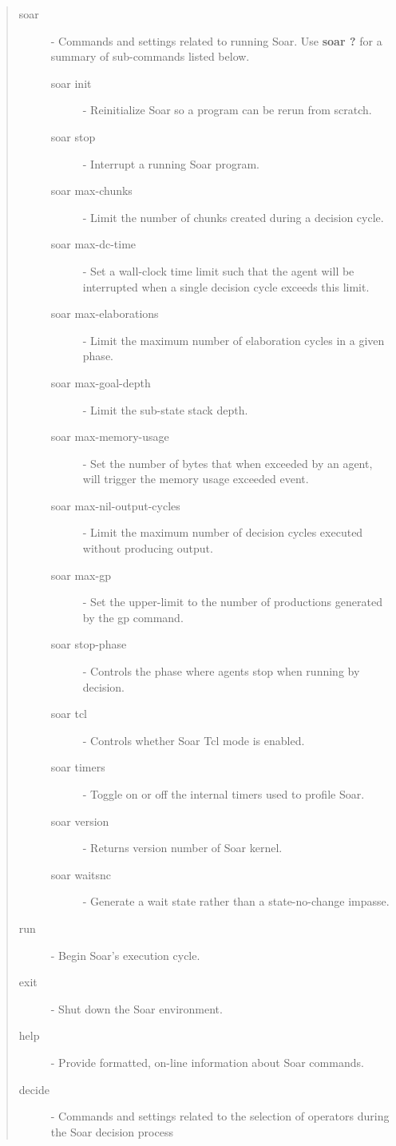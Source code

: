 \begin{quote}
	\begin{description}
		\item[soar] - Commands and settings related to running Soar. Use \textbf{soar ?} for a summary of sub-commands listed below.
		\begin{description}
			\item[soar init] - Reinitialize Soar so a program can be rerun from scratch.
			\item[soar stop] - Interrupt a running Soar program.
			\item[soar max-chunks] - Limit the number of chunks created during a decision cycle.
			\item[soar max-dc-time] - Set a wall-clock time limit such that the agent will be interrupted when a single decision cycle exceeds this limit.
			\item[soar max-elaborations] - Limit the maximum number of elaboration cycles in a given phase.
			\item[soar max-goal-depth] - Limit the sub-state stack depth.
			\item[soar max-memory-usage] - Set the number of bytes that when exceeded by an agent, will trigger the memory usage exceeded event.
			\item[soar max-nil-output-cycles] - Limit the maximum number of decision cycles executed without producing output.
			\item[soar max-gp] - Set the upper-limit to the number of productions generated by the gp command.
			\item[soar stop-phase] -  Controls the phase where agents stop when running by decision.
			\item[soar tcl] -  Controls whether Soar Tcl mode is enabled.
			\item[soar timers] - Toggle on or off the internal timers used to profile Soar.
			\item[soar version] - Returns version number of Soar kernel.
			\item[soar waitsnc] - Generate a wait state rather than a state-no-change impasse.
		\end{description}
		\item[run] - Begin Soar's execution cycle.
		\item[exit] - Shut down the Soar environment.
		\item[help] - Provide formatted, on-line information about Soar commands.
		\item[decide ] - Commands and settings related to the selection of operators during the Soar decision process

\end{description}
\end{quote}
